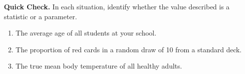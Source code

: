\documentclass[10pt]{article}
\begin{document}
\vspace{0.1in}

\begin{practicebox}
\textbf{Quick Check.} In each situation, identify whether the value described is a
statistic or a parameter.

\begin{enumerate}
  \item The average age of all students at your school. \hfill {}
  \item The proportion of red cards in a random draw of 10 from a standard deck.
        \hfill {}
  \item The true mean body temperature of all healthy adults. \hfill {}
\end{enumerate}
\end{practicebox}
\end{document}
